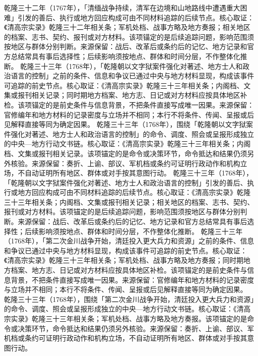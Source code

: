 乾隆三十二年（1767年），「清缅战争持续，清军在边境和山地路线中遭遇重大困难」引发的善后、执行或地方回应构成可由不同材料追踪的后续节点。核心取证：《清高宗实录》乾隆三十二年相关条；军机处档、战事方略及地方奏报；相关地区的档案、志书、契约、报刊或对方材料。该项锚定的是后续追踪问题，影响范围须按地区与群体分别判断。来源保留：战后、改革后或条约后的记忆、地方记录和官方总结常具有事后选择性；后续影响须按地点、群体和时间分层，不作整体化推断。
乾隆三十三年（1768年），「乾隆朝以文字狱案件强化对著述、地方士人和政治语言的控制」之前的条件、信息和争议已通过中央与地方材料显现，构成该事件可追踪的前史节点。核心取证：《清高宗实录》乾隆三十三年相关条；内阁档、文集或报刊相关记录；同时期地方档案、地方志、日记或对方材料应按具体地区补检。该项锚定的是前史条件与信息背景，不把条件直接写成唯一因果。来源保留：官修编年和地方材料的记录密度与立场并不相同；本行不将条件、传闻、呈报或后见解释直接等同为确定因果。
乾隆三十三年（1768年），围绕「乾隆朝以文字狱案件强化对著述、地方士人和政治语言的控制」的命令、调度、照会或呈报形成独立的中央—地方行动文书链。核心取证：《清高宗实录》乾隆三十三年相关条；内阁档、文集或报刊相关记录。该项锚定的是命令或决策环节，命令抵达和结果仍须另外核验。来源保留：奏折、上谕、部议、军机档或条约可证明行政动作和机构立场，不自动证明所有地区、群体或对手按其意图行动。
乾隆三十三年（1768年），「乾隆朝以文字狱案件强化对著述、地方士人和政治语言的控制」引发的善后、执行或地方回应构成可由不同材料追踪的后续节点。核心取证：《清高宗实录》乾隆三十三年相关条；内阁档、文集或报刊相关记录；相关地区的档案、志书、契约、报刊或对方材料。该项锚定的是后续追踪问题，影响范围须按地区与群体分别判断。来源保留：战后、改革后或条约后的记忆、地方记录和官方总结常具有事后选择性；后续影响须按地点、群体和时间分层，不作整体化推断。
乾隆三十三年（1768年），「第二次金川战争开始，清廷投入更大兵力和资源」之前的条件、信息和争议已通过中央与地方材料显现，构成该事件可追踪的前史节点。核心取证：《清高宗实录》乾隆三十三年相关条；军机处档、战事方略及地方奏报；同时期地方档案、地方志、日记或对方材料应按具体地区补检。该项锚定的是前史条件与信息背景，不把条件直接写成唯一因果。来源保留：官修编年和地方材料的记录密度与立场并不相同；本行不将条件、传闻、呈报或后见解释直接等同为确定因果。
乾隆三十三年（1768年），围绕「第二次金川战争开始，清廷投入更大兵力和资源」的命令、调度、照会或呈报形成独立的中央—地方行动文书链。核心取证：《清高宗实录》乾隆三十三年相关条；军机处档、战事方略及地方奏报。该项锚定的是命令或决策环节，命令抵达和结果仍须另外核验。来源保留：奏折、上谕、部议、军机档或条约可证明行政动作和机构立场，不自动证明所有地区、群体或对手按其意图行动。
